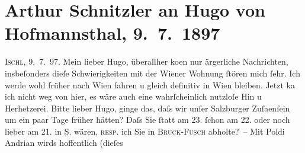 

         
         \renewcommand{\erwaehntePersonen}{Personen: Leopold von Andrian-Werburg, Hugo von Hofmannsthal}
         \renewcommand{\erwaehnteOrte}{Orte: Bad Ischl, Bruck an der Großglocknerstraße, Fusch an der Großglocknerstraße, Salzburg, Wien}
         \renewcommand{\erwaehnteWerke}{}
               \section[Arthur Schnitzler an Hugo von Hofmannsthal, 9. 7. 1897]{ Arthur Schnitzler an Hugo von Hofmannsthal, 9. 7. 1897}\nopagebreak{}\rehead{ }\begin{ledgroupsized}[t]{13cm}\normalsize\beginnumbering \toendnotes[C]{\smallbreak\pagebreak[2]} 
\pstart
           \raggedleft{}{\pb}\textsc{Ischl}, 9. 7. 97.\pend
           \pstart
           Mein lieber Hugo, überallher ko{\geminationm}en nur
               ärgerliche Nachrichten, insbeſonders dieſe Schwierigkeiten mit der Wiener Wohnung ſtören mich ſehr. Ich werde wohl früher nach Wien fahren u gleich definitiv in Wien bleiben.\pend
           \pstart
           Jetzt ka{\geminationn} ich nicht weg von hier, es wäre auch eine
               wahrſcheinlich nutzloſe Hin u Herhetzerei. {\pb}Bitte lieber
               Hugo, ginge das, daſs wir unſer Salzburger Zuſa{\geminationm}enſein um ein paar Tage früher hätten? Daſs Sie ſtatt
               am 23.{ }ſchon am 22. oder noch lieber am
                  21. in S. wären, \textsc{resp.} ich Sie in \textsc{Bruck}-\textsc{Fusch} abholte? –\pend
           \pstart
           Mit Poldi Andrian wirds hoffentlich (dieſes

\end{ledgroupsized}
